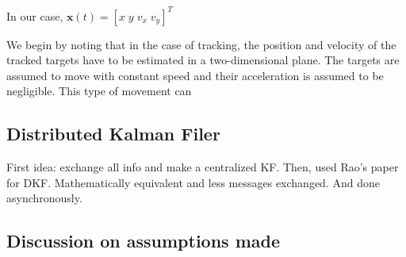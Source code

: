 In our case, $ \boldsymbol{x}(t) = [x\; y\; v_x\; v_y]^T$

We begin by noting that in the case of tracking, the position and velocity of the tracked targets have to be estimated in a two-dimensional plane. The targets are assumed to move with constant speed and their acceleration is assumed to be negligible. This type of movement can 



\subsection{Distributed Kalman Filer}

First idea: exchange all info and make a centralized KF.
Then, used Rao's paper for DKF. Mathematically equivalent and less messages exchanged. And done asynchronously. 

\subsection{Discussion on assumptions made}
